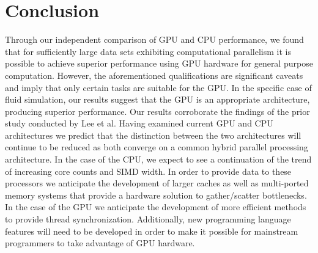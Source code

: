 \documentclass[conference]{IEEEtran}
\begin{document}
\section{Conclusion}

Through our independent comparison of GPU and CPU performance, we found that for sufficiently large data sets exhibiting computational parallelism it is possible to achieve superior performance using GPU hardware for general purpose computation. However, the aforementioned qualifications are significant caveats and imply that only certain tasks are suitable for the GPU. In the specific case of fluid simulation, our results suggest that the GPU is an appropriate architecture, producing superior performance. Our results corroborate the findings of the prior study conducted by Lee et al. Having examined current GPU and CPU architectures we predict that the distinction between the two architectures will continue to be reduced as both converge on a common hybrid parallel processing architecture. In the case of the CPU, we expect to see a continuation of the trend of increasing core counts and SIMD width. In order to provide data to these processors we anticipate the development of larger caches as well as multi-ported memory systems that provide a hardware solution to gather/scatter bottlenecks. In the case of the GPU we anticipate the development of more efficient methods to provide thread synchronization. Additionally, new programming language features will need to be developed in order to make it possible for mainstream programmers to take advantage of GPU hardware.
\end{document}
